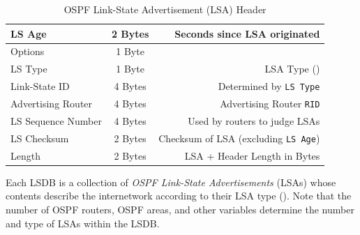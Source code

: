 \documentclass[12pt]{article}
\begin{document}
	\begin{table}[H]
	\centering
	\caption{OSPF Link-State Advertisement (LSA) Header \label{tab:OSPF LSA}}
	\begin{tabular}{| l | c | r |}
	\hline
	LS Age			& 2 Bytes	& Seconds since LSA originated\\\hline
	Options			& 1 Byte	&\\\hline
	LS Type			& 1 Byte	& LSA Type (\Cref{tab:OSPF LSA TYPES})\\\hline
	Link-State ID		& 4 Bytes	& Determined by \texttt{LS Type}\\\hline
	Advertising Router	& 4 Bytes	& Advertising Router \texttt{RID}\\\hline
	LS Sequence Number	& 4 Bytes	& Used by routers to judge LSAs\\\hline
	LS Checksum		& 2 Bytes	& Checksum of LSA (excluding \texttt{LS Age})\\\hline
	Length			& 2 Bytes	& LSA + Header Length in Bytes\\\hline
	\end{tabular}\end{table}
	Each LSDB is a collection of \textit{OSPF Link-State Advertisements} (LSAs) whose contents describe the internetwork according to their LSA type (). Note that the number of OSPF routers, OSPF areas, and other variables determine the number and type of LSAs within the LSDB.
\end{document}
